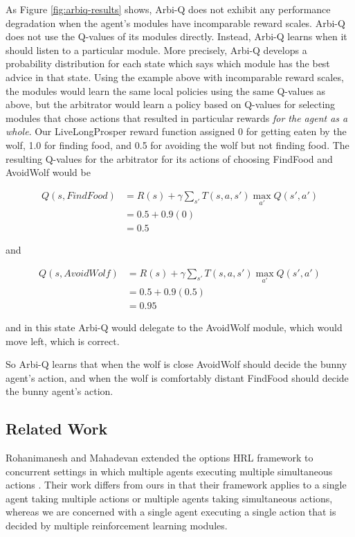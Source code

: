 As Figure \ref{fig:arbiq-results} shows, Arbi-Q does not exhibit any performance degradation when the agent's modules have incomparable reward scales. Arbi-Q does not use the Q-values of its modules directly. Instead, Arbi-Q learns when it should listen to a particular module. More precisely, Arbi-Q develops a probability distribution for each state which says which module has the best advice in that state. Using the example above with incomparable reward scales, the modules would learn the same local policies using the same Q-values as above, but the arbitrator would learn a policy based on Q-values for selecting modules that chose actions that resulted in particular rewards {\it for the agent as a whole}. Our LiveLongProsper reward function assigned 0 for getting eaten by the wolf, 1.0 for finding food, and 0.5 for avoiding the wolf but not finding food. The resulting Q-values for the arbitrator for its actions of choosing FindFood and AvoidWolf would be

\begin{align*}
Q(s, FindFood) &= R(s) + \gamma \sum_{s'} T(s, a, s') \max_{a'} Q(s', a')\\
               &= 0.5 + 0.9 (0)\\
               &= 0.5
\end{align*}

and

\begin{align*}
Q(s, AvoidWolf) &= R(s) + \gamma \sum_{s'} T(s, a, s') \max_{a'} Q(s', a')\\
                &= 0.5 + 0.9 (0.5)\\
                &= 0.95
\end{align*}

and in this state Arbi-Q would delegate to the AvoidWolf module, which would move left, which is correct.

So Arbi-Q learns that when the wolf is close AvoidWolf should decide the bunny agent's action, and when the wolf is comfortably distant FindFood should decide the bunny agent's action.

\subsection{Related Work}

Rohanimanesh and Mahadevan extended the options HRL framework to concurrent settings in which multiple agents executing multiple simultaneous actions \cite{rohanimanesh2001decision,rohanimanesh2002learning}. Their work differs from ours in that their framework applies to a single agent taking multiple actions or multiple agents taking simultaneous actions, whereas we are concerned with a single agent executing a single action that is decided by multiple reinforcement learning modules.

